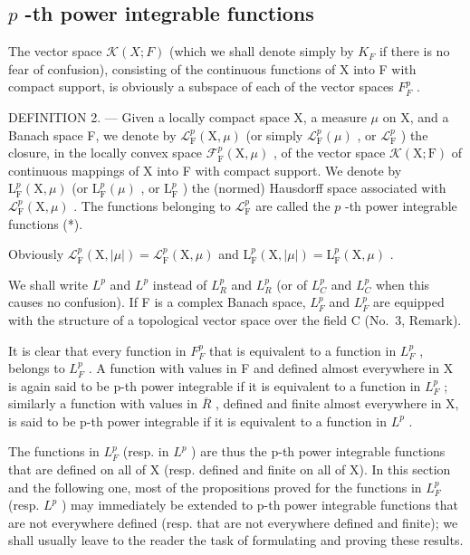 \subsection{\texorpdfstring{\(p\) -th power integrable functions}{p -th power integrable functions}}

The vector space \(\mathcal{K}(X;F)\) (which we shall denote simply by \(K_{F}\) if there is no fear of confusion), consisting of the continuous functions of X into F with compact support, is obviously a subspace of each of the vector spaces \(F_{F}^{p}\) .

DEFINITION 2. --- Given a locally compact space X, a measure \(\mu\) on X, and a Banach space F, we denote by \(\mathcal{L}_{\mathrm{F}}^{p}(\mathrm{X},\mu)\) (or simply \(\mathcal{L}_{\mathrm{F}}^{p}(\mu)\) , or \(\mathcal{L}_{\mathrm{F}}^{p}\) ) the closure, in the locally convex space \(\mathcal{F}_{\mathrm{F}}^{p}(\mathrm{X},\mu)\) , of the vector space \(\mathcal{K}(\mathrm{X};\mathrm{F})\) of continuous mappings of X into F with compact support. We denote by \(\mathrm{L}_{\mathrm{F}}^{p}(\mathrm{X},\mu)\) (or \(\mathrm{L}_{\mathrm{F}}^{p}(\mu)\) , or \(\mathrm{L}_{\mathrm{F}}^{p}\) ) the (normed) Hausdorff space associated with \(\mathcal{L}_{\mathrm{F}}^{p}(\mathrm{X},\mu)\) . The functions belonging to \(\mathcal{L}_{\mathrm{F}}^{p}\) are called the \(p\) -th power integrable functions (*).

Obviously \(\mathcal{L}_{\mathrm{F}}^{p}(\mathrm{X},|\mu |) = \mathcal{L}_{\mathrm{F}}^{p}(\mathrm{X},\mu)\) and \(\mathrm{L}_{\mathrm{F}}^{p}(\mathrm{X},|\mu |) = \mathrm{L}_{\mathrm{F}}^{p}(\mathrm{X},\mu)\) .

We shall write \(L^{p}\) and \(L^{p}\) instead of \(L_{R}^{p}\) and \(L_{R}^{p}\) (or of \(L_{C}^{p}\) and \(L_{C}^{p}\) when this causes no confusion). If F is a complex Banach space, \(L_{F}^{p}\) and \(L_{F}^{p}\) are equipped with the structure of a topological vector space over the field C (No.~3, Remark).

It is clear that every function in \(F_{F}^{p}\) that is equivalent to a function in \(L_{F}^{p}\) , belongs to \(L_{F}^{p}\) . A function with values in F and defined almost everywhere in X is again said to be p-th power integrable if it is equivalent to a function in \(L_{F}^{p}\) ; similarly a function with values in \(\overline{R}\) , defined and finite almost everywhere in X, is said to be p-th power integrable if it is equivalent to a function in \(L^{p}\) .

The functions in \(L_{F}^{p}\) (resp. in \(L^{p}\) ) are thus the p-th power integrable functions that are defined on all of X (resp. defined and finite on all of X). In this section and the following one, most of the propositions proved for the functions in \(L_{F}^{p}\) (resp. \(L^{p}\) ) may immediately be extended to p-th power integrable functions that are not everywhere defined (resp. that are not everywhere defined and finite); we shall usually leave to the reader the task of formulating and proving these results.

